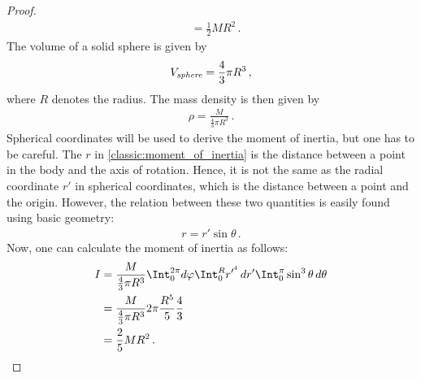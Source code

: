 \begin{example}
\begin{mdframed}[roundcorner=10pt, linecolor=blue, linewidth=1pt]
\begin{proof}
\begin{align*}
                    &= \frac{1}{2}MR^2\,.
                \end{align*}
                The volume of a solid sphere is given by
                \begin{gather*}
                    V_{\emph{sphere}} = \frac{4}{3}\pi R^3\,,
                \end{gather*}
                where $R$ denotes the radius. The mass density is then given by
                \begin{gather*}
                    \rho = \frac{M}{\frac{4}{3}\pi R^3}\,.
                \end{gather*}
                Spherical coordinates will be used to derive the moment of inertia, but one has to be careful. The $r$ in \cref{classic:moment_of_inertia} is the distance between a point in the body and the axis of rotation. Hence, it is not the same as the radial coordinate $r'$ in spherical coordinates, which is the distance between a point and the origin. However, the relation between these two quantities is easily found using basic geometry:
                \begin{gather*}
                    r=r'\sin\theta\,.
                \end{gather*}
                Now, one can calculate the moment of inertia as follows:
                \begin{align*}
                    I &= \frac{M}{\frac{4}{3}\pi R^3}\Int_0^{2\pi}d\varphi\Int_0^Rr'^{^4}\,dr'\Int_0^\pi\sin^3\theta\,d\theta\\
                    &= \frac{M}{\frac{4}{3}\pi R^3} 2\pi\frac{R^5}{5}\frac{4}{3}\\
                    &= \frac{2}{5}MR^2\,.
                \end{align*}
            \end{proof}
        \end{mdframed}
    \end{example}


